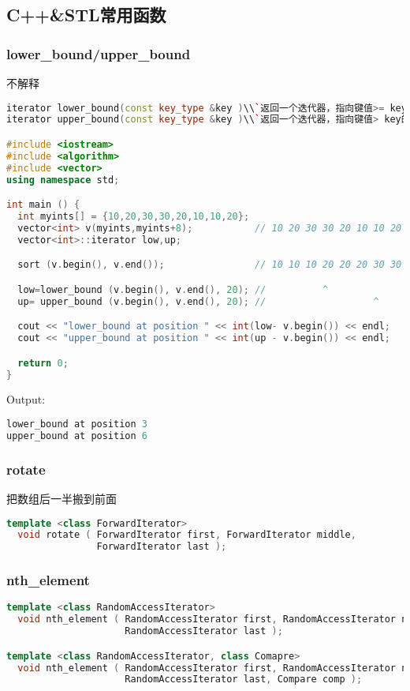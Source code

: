 \subsection{C++\&STL常用函数}
    \subsubsection{lower\_bound/upper\_bound}
	不解释\\
	\begin{lstlisting}[language=c++]
iterator lower_bound(const key_type &key )\\`返回一个迭代器，指向键值>= key的第一个元素。`
iterator upper_bound(const key_type &key )\\`返回一个迭代器，指向键值> key的第一个元素。`

#include <iostream>
#include <algorithm>
#include <vector>
using namespace std;

int main () {
  int myints[] = {10,20,30,30,20,10,10,20};
  vector<int> v(myints,myints+8);           // 10 20 30 30 20 10 10 20
  vector<int>::iterator low,up;

  sort (v.begin(), v.end());                // 10 10 10 20 20 20 30 30

  low=lower_bound (v.begin(), v.end(), 20); //          ^
  up= upper_bound (v.begin(), v.end(), 20); //                   ^

  cout << "lower_bound at position " << int(low- v.begin()) << endl;
  cout << "upper_bound at position " << int(up - v.begin()) << endl;

  return 0;
}
	\end{lstlisting}
	Output:\\
	\begin{lstlisting}[language=c++]
lower_bound at position 3
upper_bound at position 6
	\end{lstlisting}
	
    \subsubsection{rotate}
	把数组后一半搬到前面\\
	\begin{lstlisting}[language=c++]
template <class ForwardIterator>
  void rotate ( ForwardIterator first, ForwardIterator middle,
                ForwardIterator last );
	\end{lstlisting}
	
    \subsubsection{nth\_element}
	\begin{lstlisting}[language=c++]
template <class RandomAccessIterator>
  void nth_element ( RandomAccessIterator first, RandomAccessIterator nth,
                     RandomAccessIterator last );

template <class RandomAccessIterator, class Comapre>
  void nth_element ( RandomAccessIterator first, RandomAccessIterator nth,
                     RandomAccessIterator last, Compare comp );
	\end{lstlisting}
	
